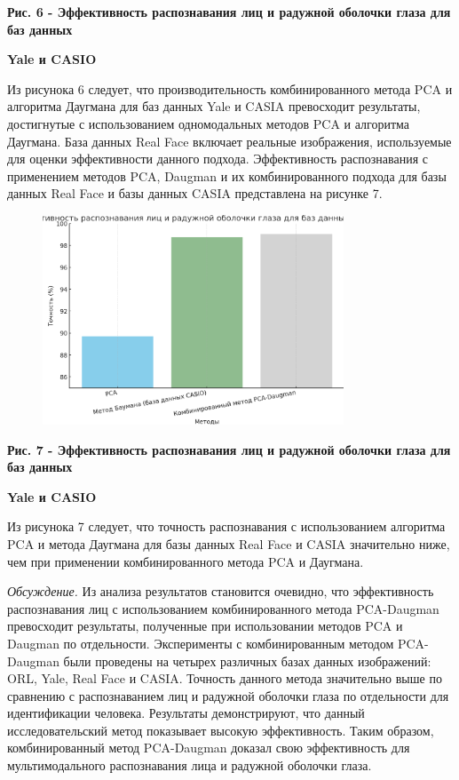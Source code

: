 {\bfseries Рис. 6 - Эффективность распознавания лиц и радужной оболочки
глаза для баз данных}

{\bfseries Yale и CASIO}

Из рисунока 6 следует, что производительность комбинированного метода
PCA и алгоритма Даугмана для баз данных Yale и CASIA превосходит
результаты, достигнутые с использованием одномодальных методов PCA и
алгоритма Даугмана. База данных Real Face включает реальные изображения,
используемые для оценки эффективности данного подхода. Эффективность
распознавания с применением методов PCA, Daugman и их комбинированного
подхода для базы данных Real Face и базы данных CASIA представлена на
рисунке 7.

\begin{figure}[H]
	\centering
	\includegraphics[width=0.8\textwidth]{assets/89}
	\caption*{}
\end{figure}

{\bfseries Рис. 7 - Эффективность распознавания лиц и радужной оболочки
глаза для баз данных}

{\bfseries Yale и CASIO}

Из рисунока 7 следует, что точность распознавания с использованием
алгоритма PCA и метода Даугмана для базы данных Real Face и CASIA
значительно ниже, чем при применении комбинированного метода PCA и
Даугмана.

\emph{Обсуждение.} Из анализа результатов становится очевидно, что
эффективность распознавания лиц с использованием комбинированного метода
PCA-Daugman превосходит результаты, полученные при использовании методов
PCA и Daugman по отдельности. Эксперименты с комбинированным методом
PCA-Daugman были проведены на четырех различных базах данных
изображений: ORL, Yale, Real Face и CASIA. Точность данного метода
значительно выше по сравнению с распознаванием лиц и радужной оболочки
глаза по отдельности для идентификации человека. Результаты
демонстрируют, что данный исследовательский метод показывает высокую
эффективность. Таким образом, комбинированный метод PCA-Daugman доказал
свою эффективность для мультимодального распознавания лица и радужной
оболочки глаза.

